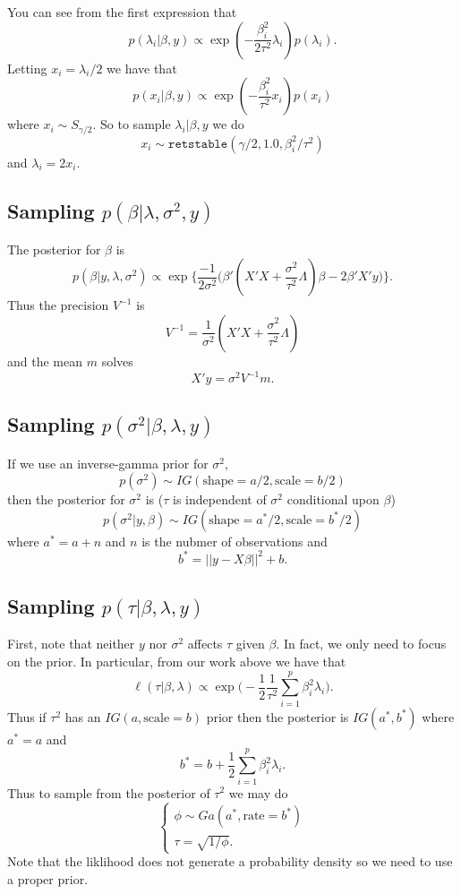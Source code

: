 \documentclass{article}
\begin{document}
You can see from the first expression that
\[
p(\lambda_i | \beta, y) \propto \exp(- \frac{\beta_i^2}{2 \tau^2} \lambda_i) p(\lambda_i).
\]
Letting $x_i = \lambda_i / 2$ we have that
\[
p(x_i | \beta, y) \propto \exp(- \frac{\beta_i^2}{\tau^2} x_i) p(x_i)
\]
where $x_i \sim S_{\gamma / 2}$.  So to sample $\lambda_i | \beta, y$ we do
\[
x_i \sim \texttt{retstable}(\gamma / 2, 1.0, \beta_i^2 / \tau^2)
\]
and $\lambda_i = 2 x_i$.

\subsection{Sampling $p(\beta | \lambda, \sigma^2, y)$}

The posterior for $\beta$ is
\[
p(\beta | y, \lambda, \sigma^2) \propto
\exp \Big\{ \frac{-1}{2 \sigma^2} \Big( \beta' (X'X + \frac{\sigma^2}{\tau^2}
\Lambda) \beta - 2 \beta' X' y \Big) \Big\}.
\]
Thus the precision $V^{-1}$ is
\[
V^{-1} = \frac{1}{\sigma^2} (X'X + \frac{\sigma^2}{\tau^2} \Lambda)
\]
and the mean $m$ solves
\[
X'y = \sigma^2 V^{-1} m.
\]

\subsection{Sampling $p(\sigma^2 | \beta, \lambda, y)$}

If we use an inverse-gamma prior for $\sigma^2$,
\[
p(\sigma^2) \sim IG(\text{shape}=a/2, \text{scale}=b/2)
\]
then the posterior for $\sigma^2$ is  ($\tau$ is independent of $\sigma^2$ conditional upon $\beta$)
\[
p(\sigma^2 | y, \beta) \sim IG(\text{shape}=a^*/2, \text{scale}=b^*/2)
\]
where $a^* = a + n$ and $n$ is the nubmer of observations and
\[
b^* = ||y - X \beta||^2 + b.
\]

\subsection{Sampling $p(\tau | \beta, \lambda, y)$}

First, note that neither $y$ nor $\sigma^2$ affects $\tau$ given $\beta$.  In
fact, we only need to focus on the prior.  In particular, from our work above we
have that
\[
\ell(\tau | \beta, \lambda) \propto \exp \Big( -\frac{1}{2} \frac{1}{\tau^2}
\sum_{i=1}^p \beta_i^2 \lambda_i \Big).
\]
Thus if $\tau^2$ has an $IG(a, \text{scale}=b)$ prior then the posterior is $IG(a^*,
b^*)$ where $a^* = a$ and 
\[
b^* = b + \frac{1}{2} \sum_{i=1}^p \beta_i^2 \lambda_i.
\]
Thus to sample from the posterior of $\tau^2$ we may do
\[
\begin{cases}
\phi \sim Ga(a^*, \text{rate}=b^*) \\
\tau = \sqrt{1/\phi}.
\end{cases}
\]
Note that the liklihood does not generate a probability density so we need to
use a proper prior.
\end{document}
